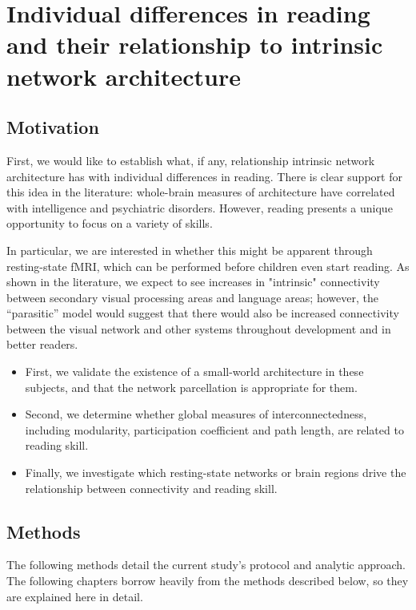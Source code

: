 \chapter{Individual differences in reading and their relationship to intrinsic network architecture}

\section{Motivation}

First, we would like to establish what, if any, relationship intrinsic network architecture has with individual differences in reading. There is clear support for this idea in the literature: whole-brain measures of architecture have correlated with intelligence and psychiatric disorders. However, reading presents a unique opportunity to focus on a variety of skills. 

In particular, we are interested in whether this might be apparent through resting-state fMRI, which can be performed before children even start reading. As shown in the literature, we expect to see increases in "intrinsic" connectivity between secondary visual processing areas and language areas; however, the ``parasitic'' model would suggest that there would also be increased connectivity between the visual network and other systems throughout development and in better readers. 

\begin{itemize}
    \item First, we validate the existence of a small-world architecture in these subjects, and that the network parcellation is appropriate for them.
    \item Second, we determine whether global measures of interconnectedness, including modularity, participation coefficient and path length, are related to reading skill.
    \item Finally, we investigate which resting-state networks or brain regions drive the relationship between connectivity and reading skill.
\end{itemize}


\section{Methods}

The following methods detail the current study's protocol and analytic approach. The following chapters borrow heavily from the methods described below, so they are explained here in detail. 

